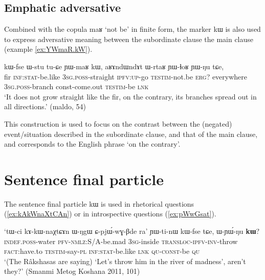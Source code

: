 \documentclass[oldfontcommands,oneside,a4paper,11pt]{article}
\newcommand{\ipa}[1]{{\phon #1}} %
\begin{document}
  
 \subsection{Emphatic adversative} \label{sec:advers}
Combined with the copula \ipa{maʁ} `not be' in finite form, the marker \ipa{kɯ} is also used to express adversative meaning between the subordinate clause the main clause (example \ref{ex:YWmaR.kW}).
 
  \begin{exe} 
 \ex \label{ex:YWmaR.kW}
\gll \ipa{tɯrgi} 	\ipa{kɯ-fse} 	\ipa{ɯ-stu} 	\ipa{tu-ɕe} 	\ipa{ɲɯ-maʁ} 	\ipa{kɯ,} \ipa{aʁɤndɯndɤt} 	\ipa{ɯ-rtaʁ} 	\ipa{ɲɯ-ɬoʁ} 	\ipa{ɲɯ-ŋu} 	\ipa{tɕe,} 
\\
fir \textsc{inf:stat}-be.like \textsc{3sg.poss}-straight \textsc{ipfv:up}-go \textsc{testim}-not.be \textsc{erg}? everywhere \textsc{3sg.poss}-branch const-come.out \textsc{testim}-be \textsc{lnk} \\ 
\glt `It does not grow straight like the fir, on the contrary, its branches spread out in all directions.'  
(maldo, 54)
 \end{exe}  
 
 This construction is used to focus on the contrast between the (negated) event/situation described in the subordinate clause, and that of the main clause, and corresponds to the English phrase `on the contrary'.
 
 \section{Sentence final particle} \label{sec:compl}
 
 
The sentence final particle \ipa{kɯ} is used in rhetorical questions (\ref{ex:kAkWnaXtCAn}) or in introspective questions (\ref{ex:pWwGsat}).
 \begin{exe} 
 \ex \label{ex:kAkWnaXtCAn}
\gll 
`\ipa{tɯ-ci} 	\ipa{kɤ-kɯ-naχtɕɤn} 	\ipa{ɯ-ŋgɯ} 	\ipa{ɕ-pjɯ́-wɣ-βde} 	\ipa{ra}' 	\ipa{ɲɯ-ti-nɯ} 	\ipa{kɯ-fse} 	\ipa{tɕe,} 	\ipa{ɯ-ɲɯ́-ŋu} 	\ipa{\textbf{kɯ}?} \\
\textsc{indef.poss}-water \textsc{pfv-nmlz}:S/A-be.mad \textsc{3sg}-inside \textsc{transloc-ipfv-inv}-throw \textsc{fact}:have.to \textsc{testim}-say-\textsc{pl} \textsc{inf:stat}-be.like \textsc{lnk} \textsc{qu-const}-be \textsc{qu} \\
\glt `(The Râkshasas are saying)  `Let's throw him in the river of madness', aren't they?' (Smanmi Metog Koshana 2011, 101)
\end{exe} 
 
\end{document}
